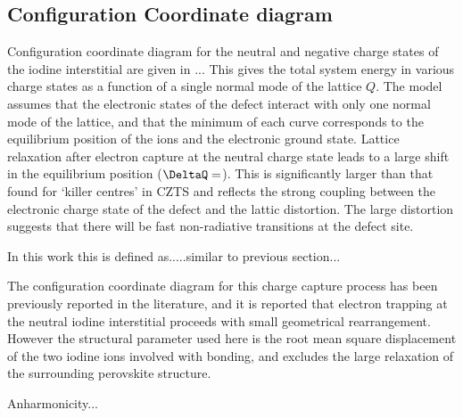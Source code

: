 \subsection{Configuration Coordinate diagram}

Configuration coordinate diagram for the neutral and negative charge states of the iodine interstitial are given in ...
This gives the total system energy in various charge states as a function of a single normal mode of the lattice $Q$. 
The model assumes that the electronic states of the defect interact with only one normal mode of the lattice, and that
the minimum of each curve corresponds to the equilibrium position of the ions and the electronic ground state. 
\autocite{alkauskas defect theory and experiment}
Lattice relaxation after electron capture at the neutral charge state leads to a large shift in the equilibrium position ($\DeltaQ=$).
This is significantly larger than that found for `killer centres' in CZTS\autocite{Sunghyun} and reflects the strong coupling between the electronic charge state of the defect and the lattic distortion. The large distortion suggests that there will be fast non-radiative transitions at the defect site. \autocite{Stoneham}

In this work this is defined as.....similar to previous section...

The configuration coordinate diagram for this charge capture process has been previously reported in the literature,\cite{Meggiolaro2018} and it is reported that electron trapping at the neutral iodine interstitial proceeds with small geometrical rearrangement. However the structural parameter used here is the root mean square displacement of the two iodine ions involved with bonding, and excludes the large relaxation of the surrounding perovskite structure.


Anharmonicity...

 
 
